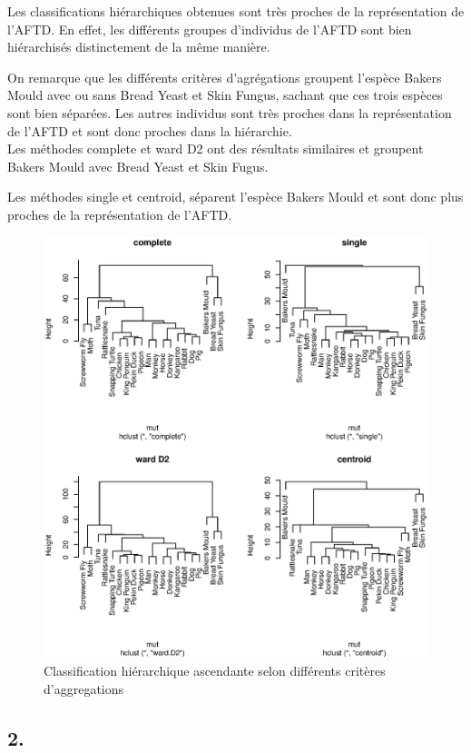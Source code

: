 \documentclass{article}
\begin{document}
Les classifications hiérarchiques obtenues sont très proches de la représentation de l'AFTD. En effet, les différents groupes d'individus de l'AFTD sont bien hiérarchisés distinctement de la même manière.

On remarque que les différents critères d'agrégations groupent l'espèce Bakers Mould avec ou sans Bread Yeast et Skin Fungus, sachant que ces trois espèces sont bien séparées. Les autres individus sont très proches dans la représentation de l'AFTD et sont donc proches dans la hiérarchie.\\
Les méthodes complete et ward D2 ont des résultats similaires et groupent Bakers Mould avec Bread Yeast et Skin Fugus.

Les méthodes single et centroid, séparent l'espèce Bakers Mould et sont donc plus proches de la représentation de l'AFTD.

\begin{figure}[H]
\centering
\includegraphics[scale=0.83]{./img/mut_cah_par22.eps}
\caption{Classification hiérarchique ascendante selon différents critères d'aggregations}
\label{mut_cah_par}
\end{figure}


\subsection*{2.}
\end{document}
